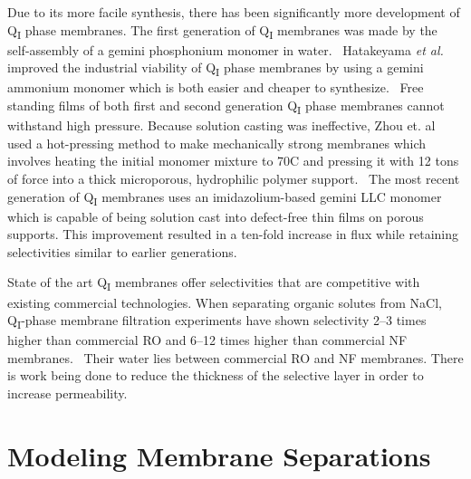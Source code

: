   Due to its more facile synthesis, there has been significantly more development
  of Q\textsubscript{I} phase membranes. The first generation of Q\textsubscript{I}
  membranes was made by the self-assembly of a gemini phosphonium monomer in 
  water.~\cite{pindzola_cross-linked_2003} Hatakeyama \textit{et al.} improved the 
  industrial viability of Q\textsubscript{I} phase membranes by using a gemini 
  ammonium monomer which is both easier and cheaper to synthesize.~\cite{hatakeyama_nanoporous_2010}
  Free standing films of both first and second generation Q\textsubscript{I} phase 
  membranes cannot withstand high pressure. Because solution casting was ineffective,
  Zhou et. al used a hot-pressing method to make mechanically strong membranes which
  involves heating the initial monomer mixture to 70\degree C and pressing it with 12
  tons of force into a thick microporous, hydrophilic polymer support.~\cite{zhou_new_2007}
  The most recent generation of Q\textsubscript{I} membranes uses an imidazolium-based
  gemini LLC monomer which is capable of being solution cast into defect-free thin films 
  on porous supports. This improvement resulted in a ten-fold increase in flux while 
  retaining selectivities similar to earlier generations.~\cite{carter_glycerol-based_2012}
  
  
  State of the art Q\textsubscript{I} membranes offer selectivities that
  are competitive with existing commercial technologies. When separating organic
  solutes from NaCl, Q\textsubscript{I}-phase membrane filtration experiments have
  shown selectivity 2--3 times higher than commercial RO and 6--12 times higher 
  than commercial NF membranes.~\cite{dischinger_application_2017} Their water 
  lies between commercial RO and NF membranes. There is work being done to reduce 
  the thickness of the selective layer in order to increase permeability. 

  \section{Modeling Membrane Separations}
  

